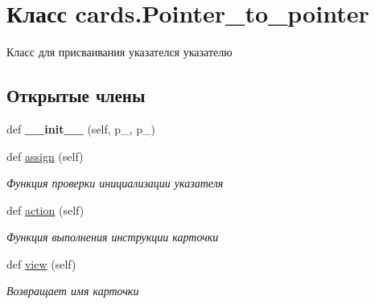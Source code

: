 \hypertarget{classcards_1_1_pointer__to__pointer}{}\section{Класс cards.\+Pointer\+\_\+to\+\_\+pointer}
\label{classcards_1_1_pointer__to__pointer}


Класс для присваивания указателся указателю  


\subsection*{Открытые члены}
\begin{DoxyCompactItemize}
\item 
\mbox{\label{classcards_1_1_pointer__to__pointer_a8822ada08725e99473c2e24482d6dbb5}} 
def {\bfseries \+\_\+\+\_\+init\+\_\+\+\_\+} (self, p\+\_, p\+\_)
\item 
\mbox{\label{classcards_1_1_pointer__to__pointer_af23ca8bd0fac1e8465ffec07c4fb26f7}} 
def \mbox{\hyperlink{classcards_1_1_pointer__to__pointer_af23ca8bd0fac1e8465ffec07c4fb26f7}{assign}} (self)
\begin{DoxyCompactList}\small\item\em Функция проверки инициализации указателя \end{DoxyCompactList}\item 
def \mbox{\hyperlink{classcards_1_1_pointer__to__pointer_a233d4b2b07faa521173760898cce72be}{action}} (self)
\begin{DoxyCompactList}\small\item\em Функция выполнения инструкции карточки \end{DoxyCompactList}\item 
def \mbox{\hyperlink{classcards_1_1_pointer__to__pointer_a4c313ca253c448ba0cb85f7688bc7dd1}{view}} (self)
\begin{DoxyCompactList}\small\item\em Возвращает имя карточки \end{DoxyCompactList}\end{DoxyCompactItemize}
